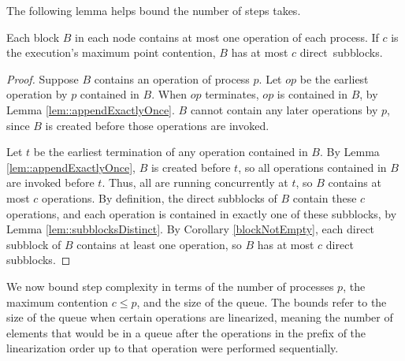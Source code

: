The following lemma helps bound the number of steps  takes.
\begin{lemma}\label{blockSize}
Each block $B$ in each node contains at most one operation of each process.
If $c$ is the execution's maximum point contention, $B$ has at most $c$ direct~subblocks.
\end{lemma}
\begin{proof}
Suppose $B$ contains an operation of process $p$.
Let $op$ be the earliest operation by $p$ contained in $B$.
When $op$ terminates, $op$ is contained in $B$, by Lemma \ref{lem::appendExactlyOnce}.
$B$ cannot contain any later operations by $p$, since $B$ is created before
those operations are invoked.

Let $t$ be the earliest termination of any operation contained in $B$.
By Lemma \ref{lem::appendExactlyOnce}, $B$ is created before $t$, so all operations contained in $B$
are invoked before $t$.  Thus, all are  running concurrently at $t$, so $B$ contains at most $c$ operations.
By definition, the direct subblocks of $B$ contain these $c$ operations, and each operation is contained
in exactly one of these subblocks, by Lemma \ref{lem::subblocksDistinct}.
By Corollary \ref{blockNotEmpty}, each direct subblock of $B$ contains at least one operation,
so $B$ has at most $c$ direct subblocks.
\end{proof}

We now bound step complexity in terms of the number of processes $p$, the maximum contention $c\leq p$, and the size of the queue.
The bounds refer to the size of the queue when certain operations are linearized,
meaning the number of elements that would be in a queue after the operations in the prefix
of the linearization order up to that operation were performed sequentially. 

